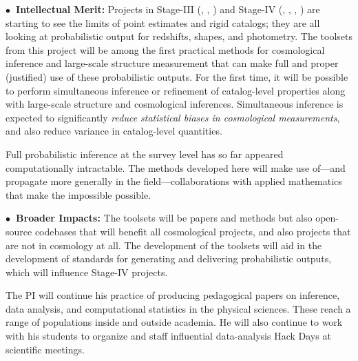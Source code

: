 \documentclass[12pt]{article}
\begin{document}
\smallskip\noindent
\textbf{$\bullet$~Intellectual Merit:}
Projects in Stage-III (\eg, \boss, \des)
and Stage-IV (\eg, \lsst, \euclid, \wfirst)
are starting to see the limits of point estimates and rigid catalogs;
they are all looking at probabilistic output for redshifts,
shapes, and photometry.
The toolsets from this project will be among the first practical methods for
cosmological inference and large-scale structure measurement that can
make full and proper (justified) use of these probabilistic outputs.
For the first time, it will be possible to perform
simultaneous inference or refinement of catalog-level properties along with
large-scale structure and cosmological inferences.
Simultaneous inference is expected to significantly \emph{reduce statistical
biases in cosmological measurements},
and also reduce variance in catalog-level quantities.

Full probabilistic inference at the survey level has so far appeared
computationally intractable.
The methods developed here will make use of---and propagate more
generally in the field---collaborations with applied mathematics that
make the impossible possible.

\smallskip\noindent
\textbf{$\bullet$~Broader Impacts:}
The toolsets will be papers and methods but also open-source codebases
that will benefit all cosmological projects, and also projects that
are not in cosmology at all.
The development of the toolsets will aid in the development of
standards for generating and delivering probabilistic outputs, which
will influence Stage-IV projects.

The PI will continue his practice of producing pedagogical papers on
inference, data analysis, and computational statistics in the physical
sciences.
These reach a range of populations inside and outside academia.
He will also continue to work with his students to organize and staff
influential data-analysis Hack Days at scientific meetings.
\end{document}
